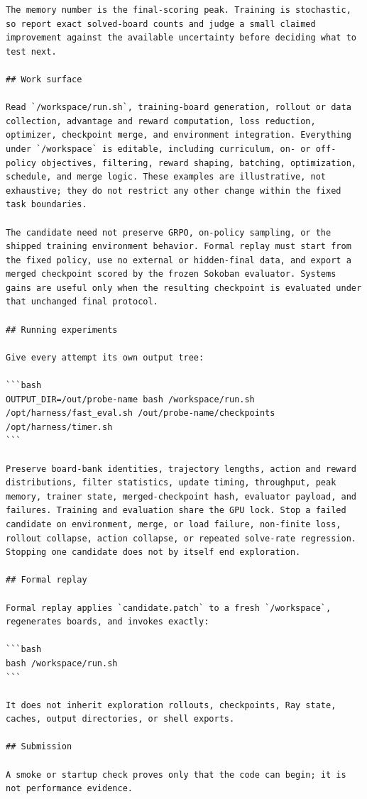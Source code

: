 \begin{lstlisting}[style=contract]
The memory number is the final-scoring peak. Training is stochastic, so report exact solved-board counts and judge a small claimed improvement against the available uncertainty before deciding what to test next.

## Work surface

Read `/workspace/run.sh`, training-board generation, rollout or data collection, advantage and reward computation, loss reduction, optimizer, checkpoint merge, and environment integration. Everything under `/workspace` is editable, including curriculum, on- or off-policy objectives, filtering, reward shaping, batching, optimization, schedule, and merge logic. These examples are illustrative, not exhaustive; they do not restrict any other change within the fixed task boundaries.

The candidate need not preserve GRPO, on-policy sampling, or the shipped training environment behavior. Formal replay must start from the fixed policy, use no external or hidden-final data, and export a merged checkpoint scored by the frozen Sokoban evaluator. Systems gains are useful only when the resulting checkpoint is evaluated under that unchanged final protocol.

## Running experiments

Give every attempt its own output tree:

```bash
OUTPUT_DIR=/out/probe-name bash /workspace/run.sh
/opt/harness/fast_eval.sh /out/probe-name/checkpoints
/opt/harness/timer.sh
```

Preserve board-bank identities, trajectory lengths, action and reward distributions, filter statistics, update timing, throughput, peak memory, trainer state, merged-checkpoint hash, evaluator payload, and failures. Training and evaluation share the GPU lock. Stop a failed candidate on environment, merge, or load failure, non-finite loss, rollout collapse, action collapse, or repeated solve-rate regression. Stopping one candidate does not by itself end exploration.

## Formal replay

Formal replay applies `candidate.patch` to a fresh `/workspace`, regenerates boards, and invokes exactly:

```bash
bash /workspace/run.sh
```

It does not inherit exploration rollouts, checkpoints, Ray state, caches, output directories, or shell exports.

## Submission

A smoke or startup check proves only that the code can begin; it is not performance evidence.


\end{lstlisting}
